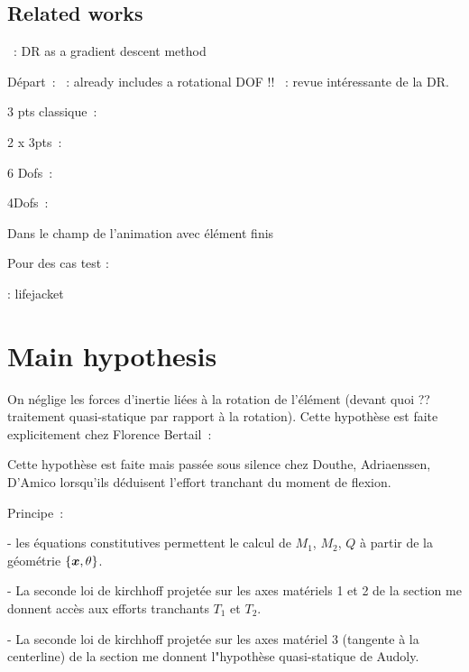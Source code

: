 \subsection{Related works}

~: DR as a gradient descent method

Départ~:
~: already includes a rotational DOF !!
~: revue intéressante de la DR.

3 pts classique~:

2 x 3pts~:

6 Dofs~:

4Dofs~:

Dans le champ de l'animation  avec élément finis

Pour des cas test :


 : lifejacket

\clearpage
\section{Main hypothesis}

On néglige les forces d'inertie liées à la rotation de l'élément  (devant quoi ?? traitement quasi-statique par rapport à la rotation). Cette hypothèse est faite explicitement chez Florence Bertail~:



Cette hypothèse est faite mais passée sous silence chez Douthe, Adriaenssen, D'Amico lorsqu'ils déduisent l'effort tranchant du moment de flexion.

Principe~:

- les équations constitutives permettent le calcul de $M_1$, $M_2$, $Q$ à partir de la géométrie $\{\boldsymbol{x},\theta\}$.

- La seconde loi de kirchhoff projetée sur les axes matériels 1 et 2 de la section me donnent accès aux efforts tranchants $T_1$ et $T_2$.

- La seconde loi de kirchhoff projetée sur les axes matériel 3 (tangente à la centerline) de la section me donnent l"hypothèse quasi-statique de Audoly.

